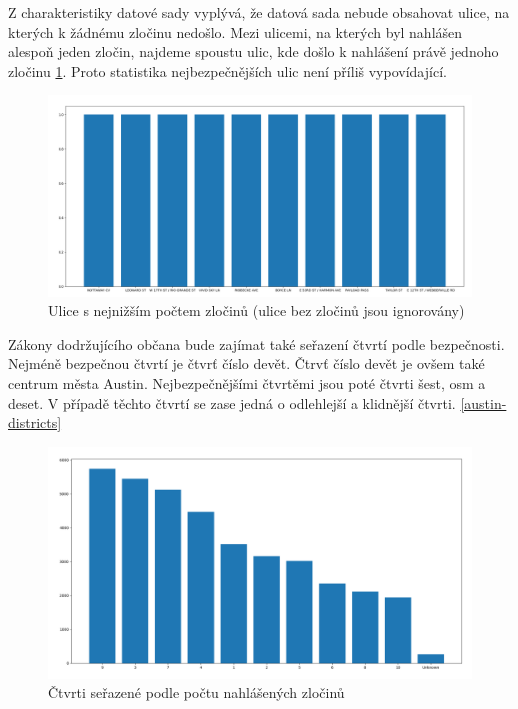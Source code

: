 \documentclass{article}
\begin{document}
Z charakteristiky datové sady vyplývá, že datová sada nebude obsahovat ulice, na kterých k žádnému
zločinu nedošlo. Mezi ulicemi, na kterých byl nahlášen alespoň jeden zločin, najdeme spoustu ulic,
kde došlo k nahlášení právě jednoho zločinu \ref{fig:safest_streets}. Proto statistika nejbezpečnějších
ulic není příliš vypovídající.

\begin{figure}
  \centering
  \includegraphics[width=1.4\textwidth]{figures/safest_streets.png}
  \caption{Ulice s nejnižším počtem zločinů (ulice bez zločinů jsou ignorovány)}
  \label{fig:safest_streets}
\end{figure}

Zákony dodržujícího občana bude zajímat také seřazení čtvrtí podle bezpečnosti. Nejméně bezpečnou čtvrtí
je čtvrť číslo devět. Čtrvť číslo devět je ovšem také centrum města Austin. Nejbezpečnějšími čtvrtěmi jsou
poté čtvrti šest, osm a deset. V případě těchto čtvrtí se zase jedná o odlehlejší a klidnější čtvrti.
\ref{austin-districts}

\begin{figure}
  \centering
  \includegraphics[width=1.4\textwidth]{figures/worst_districts.png}
  \caption{Čtvrti seřazené podle počtu nahlášených zločinů}
  \label{fig:worst_districts}
\end{figure}
\end{document}
